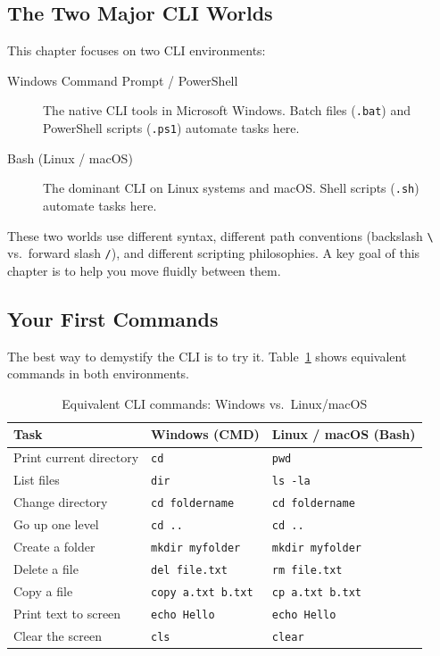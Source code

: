 \subsection{The Two Major CLI Worlds}

This chapter focuses on two CLI environments:

\begin{description}
  \item[Windows Command Prompt / PowerShell] The native CLI tools in
        Microsoft Windows. Batch files (\texttt{.bat}) and PowerShell
        scripts (\texttt{.ps1}) automate tasks here.
  \item[Bash (Linux / macOS)] The dominant CLI on Linux systems and macOS.
        Shell scripts (\texttt{.sh}) automate tasks here.
\end{description}

These two worlds use different syntax, different path conventions
(backslash \texttt{\textbackslash} vs.\ forward slash \texttt{/}), and
different scripting philosophies. A key goal of this chapter is to help you
move fluidly between them.

\subsection{Your First Commands}

The best way to demystify the CLI is to try it. Table~\ref{tab:first-commands}
shows equivalent commands in both environments.

\begin{table}[h]
\centering
\caption{Equivalent CLI commands: Windows vs.\ Linux/macOS}
\label{tab:first-commands}
\begin{tabular}{@{}lll@{}}
\toprule
\textbf{Task} & \textbf{Windows (CMD)} & \textbf{Linux / macOS (Bash)} \\
\midrule
Print current directory  & \texttt{cd}              & \texttt{pwd}             \\
List files               & \texttt{dir}             & \texttt{ls -la}          \\
Change directory         & \texttt{cd foldername}   & \texttt{cd foldername}   \\
Go up one level          & \texttt{cd ..}           & \texttt{cd ..}           \\
Create a folder          & \texttt{mkdir myfolder}  & \texttt{mkdir myfolder}  \\
Delete a file            & \texttt{del file.txt}    & \texttt{rm file.txt}     \\
Copy a file              & \texttt{copy a.txt b.txt}& \texttt{cp a.txt b.txt}  \\
Print text to screen     & \texttt{echo Hello}      & \texttt{echo Hello}      \\
Clear the screen         & \texttt{cls}             & \texttt{clear}           \\
\bottomrule
\end{tabular}
\end{table}

